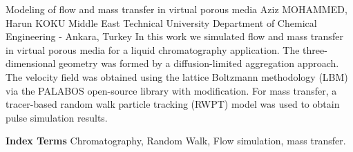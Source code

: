 
    \begin{abstract_online}{Modeling of flow and mass transfer in virtual porous media}{%
        Aziz MOHAMMED, Harun KOKU}{%
        }{%
        Middle East Technical University Department of Chemical Engineering - Ankara, Turkey}
    In this work we simulated flow and mass transfer in virtual porous media for a liquid chromatography application. The three-dimensional geometry was formed by a diffusion-limited aggregation approach. The velocity field was obtained using the lattice Boltzmann methodology (LBM) via the PALABOS open-source library with modification. For mass transfer, a tracer-based random walk particle tracking (RWPT) model was used to obtain pulse simulation results. 
    
            \textbf{Index Terms} \newline{}Chromatography, Random Walk, Flow simulation, mass transfer.
    \end{abstract_online}
    